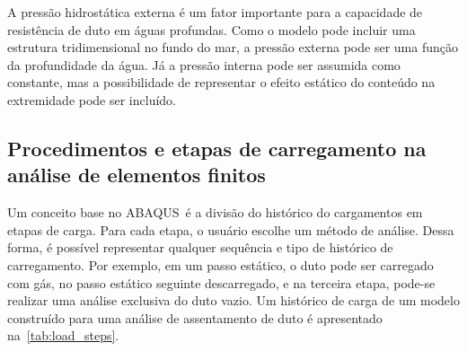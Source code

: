 A pressão hidrostática externa é um fator importante para a capacidade de resistência de duto em águas profundas.
Como o modelo pode incluir uma estrutura tridimensional no fundo do mar, a pressão externa pode ser uma função da profundidade da água.
Já a pressão interna pode ser assumida como constante, mas a possibilidade de representar o efeito estático do conteúdo na extremidade pode ser incluído.


\subsection{Procedimentos e etapas de carregamento na análise de elementos finitos}


Um conceito base no ABAQUS~é a divisão do histórico do cargamentos em etapas de carga. Para cada etapa, o usuário escolhe um método de análise.
Dessa forma, é possível representar qualquer sequência  e tipo de histórico de carregamento.
Por exemplo, em um passo estático, o duto pode ser carregado com gás, no passo estático seguinte descarregado, e na terceira etapa, pode-se realizar uma análise exclusiva do duto vazio.
Um histórico de carga de um modelo construído para uma análise de assentamento de duto é apresentado na~\autoref{tab:load_steps}.


